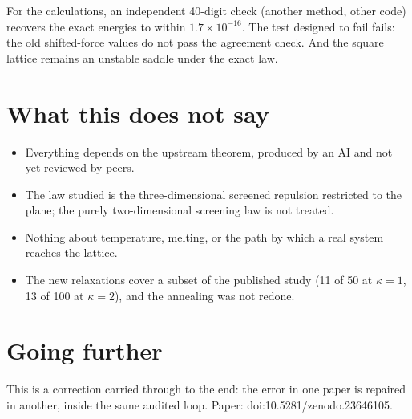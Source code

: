 For the  calculations, an independent 40-digit check (another method, other code) recovers the exact
energies to within $1.7\times10^{-16}$. The test designed to fail fails: the old shifted-force values do not pass the
agreement check. And the square lattice remains an unstable saddle under the exact law.

\section*{What this does not say}

\begin{limite}
\begin{itemize}
\item Everything depends on the upstream theorem, produced by an AI and not yet reviewed by peers.
\item The law studied is the three-dimensional screened repulsion restricted to the plane; the purely
two-dimensional screening law is not treated.
\item Nothing about temperature, melting, or the path by which a real system reaches the lattice.
\item The new relaxations cover a subset of the published study (11 of 50 at $\kappa=1$, 13 of 100 at $\kappa=2$), and
the annealing was not redone.
\end{itemize}
\end{limite}

\section*{Going further}

This is a correction carried through to the end: the error in one paper is repaired in another, inside the same
audited loop. Paper: doi:10.5281/zenodo.23646105.
